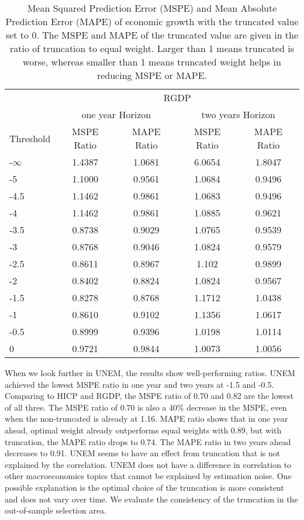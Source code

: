 \documentclass[11pt]{article}
\begin{document}
\begin{table}[!h]
	\centering
	\caption{Mean Squared Prediction Error (MSPE) and Mean Absolute Prediction Error (MAPE) of economic growth with the truncated value set to 0. The MSPE and MAPE of the truncated value are given in the ratio of truncation to equal weight. Larger than 1 means truncated is worse, whereas smaller than 1 means truncated weight helps in reducing MSPE or MAPE.}
	\label{tab: MSPE RGDP}
	\begin{tabular}{lcccc}
		\hline\hline
		& \multicolumn{4}{c}{RGDP}                                                \\
		\cmidrule(lr){2-5}
		& \multicolumn{2}{c}{one year Horizon} & \multicolumn{2}{c}{two years Horizon} \\
		\cmidrule(lr){2-3} \cmidrule(lr){4-5}
		Threshold & MSPE Ratio &    MAPE Ratio    & MSPE Ratio &    MAPE Ratio    \\ 
		\hline
		-$\infty$ & 1.4387 & 1.0681 & 6.0654 & 1.8047\\ 
		-5 & 1.1000 & 0.9561 & 1.0684 & 0.9496\\ 
		-4.5 & 1.1462 & 0.9861 & 1.0683 & 0.9496\\ 
		-4 & 1.1462 & 0.9861 & 1.0885 & 0.9621\\ 
		-3.5 & 0.8738 & 0.9029 & 1.0765 & 0.9539\\ 
		-3 & 0.8768 & 0.9046 & 1.0824 & 0.9579\\ 
		-2.5 & 0.8611 & 0.8967 & 1.102 & 0.9899\\ 
		-2 & 0.8402 & 0.8824 & 1.0824 & 0.9567\\ 
		-1.5 & 0.8278 & 0.8768 & 1.1712 & 1.0438\\ 
		-1 & 0.8610 & 0.9102 & 1.1356 & 1.0617\\ 
		-0.5 & 0.8999 & 0.9396 & 1.0198 & 1.0114\\ 
		0 & 0.9721 & 0.9844 & 1.0073 & 1.0056\\  \hline\hline
	\end{tabular}
\end{table}


When we look further in UNEM, the results show well-performing ratios. UNEM achieved the lowest MSPE ratio in one year and two years at -1.5 and -0.5. Comparing to HICP and RGDP, the MSPE ratio of 0.70 and 0.82 are the lowest of all three. The MSPE ratio of 0.70 is also a 40\% decrease in the MSPE, even when the non-truncated is already at 1.16. MAPE ratio shows that in one year ahead, optimal weight already outperforms equal weights with 0.89, but with truncation, the MAPE ratio drops to 0.74. The MAPE ratio in two years ahead decreases to 0.91. UNEM seems to have an effect from truncation that is not explained by the correlation. UNEM does not have a difference in correlation to other macroeconomics topics that cannot be explained by estimation noise. One possible explanation is the optimal choice of the truncation is more consistent and does not vary over time. We evaluate the consistency of the truncation in the out-of-sample selection area.
\end{document}
